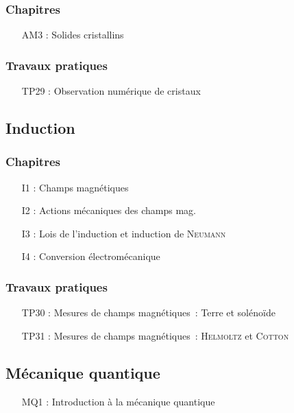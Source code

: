\documentclass[a4paper, 10pt, final, garamond]{book}
\begin{document}
\begin{multicols}{2}
	\subsubsection{Chapitres}

	\begin{itemize}[label=$\diamond$]
		\item[AM3]: Solides cristallins
	\end{itemize}

	\columnbreak

	\subsubsection{Travaux pratiques}

	\begin{itemize}[label=$\diamond$]
		\item[TP29]: Observation numérique de cristaux
	\end{itemize}

\end{multicols}

\subsection{Induction}

\begin{multicols}{2}
	\subsubsection{Chapitres}

	\begin{itemize}[label=$\diamond$]
		\item[I1]: Champs magnétiques
		\item[I2]: Actions mécaniques des champs mag.
		\item[I3]: Lois de l'induction et induction de \textsc{Neumann}
		\item[I4]: Conversion électromécanique
	\end{itemize}

	\columnbreak

	\subsubsection{Travaux pratiques}

	\begin{itemize}[label=$\diamond$]
		\item[TP30]: Mesures de champs magnétiques~: Terre et solénoïde
		\item[TP31]: Mesures de champs magnétiques~: \textsc{Helmoltz} et
		\textsc{Cotton}
	\end{itemize}

\end{multicols}

\subsection{Mécanique quantique}
\begin{itemize}[label=$\diamond$]
	\item[MQ1]: Introduction à la mécanique quantique
\end{itemize}
\end{document}
